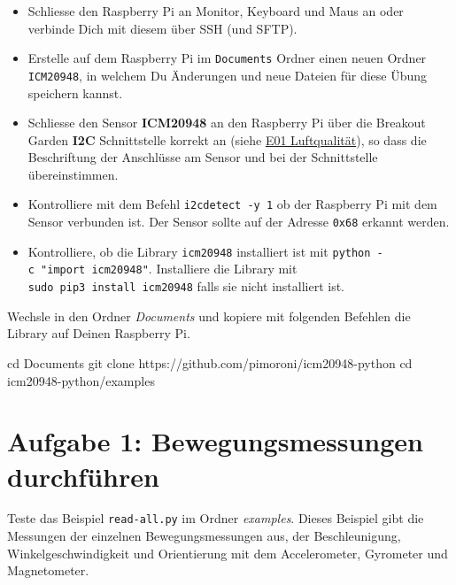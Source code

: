 \documentclass[
  11pt,
  a4paper,
  oneside, openany  ,captions=tableheading
]{scrbook}
\newenvironment{Shaded}{\begin{snugshade}}{\end{snugshade}}
\newcommand{\BuiltInTok}[1]{\textcolor[rgb]{0.00,0.23,0.31}{#1}}
\newcommand{\FunctionTok}[1]{\textcolor[rgb]{0.28,0.35,0.67}{#1}}
\newcommand{\NormalTok}[1]{\textcolor[rgb]{0.00,0.23,0.31}{#1}}
\providecommand{\tightlist}{%
  \setlength{\itemsep}{0pt}\setlength{\parskip}{0pt}}
\theoremstyle{remark}
\renewcommand{\markright}[1]{\def\chaptertitle{#1}} %
\begin{document}
\begin{itemize}
\tightlist
\item
  Schliesse den Raspberry Pi an Monitor, Keyboard und Maus an oder
  verbinde Dich mit diesem über SSH (und SFTP).
\item
  Erstelle auf dem Raspberry Pi im \texttt{Documents} Ordner einen neuen
  Ordner \texttt{ICM20948}, in welchem Du Änderungen und neue Dateien
  für diese Übung speichern kannst.
\item
  Schliesse den Sensor \textbf{ICM20948} an den Raspberry Pi über die
  Breakout Garden \textbf{I2C} Schnittstelle korrekt an (siehe
  \href{E01_Luftqualitaet.qmd}{E01 Luftqualität}), so dass die
  Beschriftung der Anschlüsse am Sensor und bei der Schnittstelle
  übereinstimmen.
\item
  Kontrolliere mit dem Befehl \texttt{i2cdetect\ -y\ 1} ob der Raspberry
  Pi mit dem Sensor verbunden ist. Der Sensor sollte auf der Adresse
  \texttt{0x68} erkannt werden.
\item
  Kontrolliere, ob die Library \texttt{icm20948} installiert ist mit
  \texttt{python\ -c\ "import\ icm20948"}. Installiere die Library mit
  \texttt{sudo\ pip3\ install\ icm20948} falls sie nicht installiert
  ist.
\end{itemize}

Wechsle in den Ordner \emph{Documents} und kopiere mit folgenden
Befehlen die Library auf Deinen Raspberry Pi.

\begin{Shaded}
\begin{Highlighting}[]
\BuiltInTok{cd}\NormalTok{ Documents}
\FunctionTok{git}\NormalTok{ clone https://github.com/pimoroni/icm20948{-}python}
\BuiltInTok{cd}\NormalTok{ icm20948{-}python/examples}
\end{Highlighting}
\end{Shaded}

\section*{Aufgabe 1: Bewegungsmessungen
durchführen}\label{aufgabe-1-bewegungsmessungen-durchfuxfchren}

\markright{Aufgabe 1: Bewegungsmessungen durchführen}

Teste das Beispiel \texttt{read-all.py} im Ordner \emph{examples}.
Dieses Beispiel gibt die Messungen der einzelnen Bewegungsmessungen aus,
der Beschleunigung, Winkelgeschwindigkeit und Orientierung mit dem
Accelerometer, Gyrometer und Magnetometer.
\end{document}
